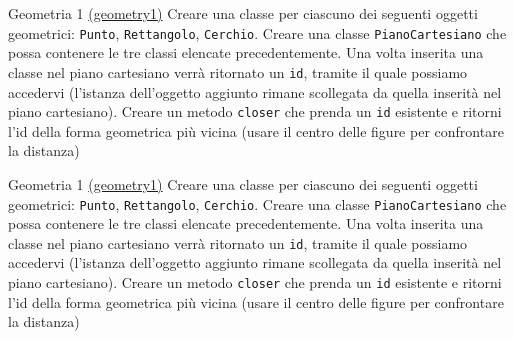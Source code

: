 \begin{esercizio}{Geometria 1 \href{run:./files/java/esercizi/geometry1/}{(geometry1)}}
	Creare una classe per ciascuno dei seguenti oggetti geometrici: \texttt{Punto}, \texttt{Rettangolo}, \texttt{Cerchio}. Creare una classe \texttt{PianoCartesiano} che possa contenere le tre classi elencate precedentemente. Una volta inserita una classe nel piano cartesiano verrà ritornato un \verb|id|, tramite il quale possiamo accedervi (l'istanza dell'oggetto aggiunto rimane scollegata da quella inserità nel piano cartesiano). Creare un metodo \verb|closer| che prenda un \verb|id| esistente e ritorni l'id della forma geometrica più vicina (usare il centro delle figure per confrontare la distanza)
\end{esercizio}

\begin{esercizio}{Geometria 1 \href{run:./files/java/esercizi/geometry1/}{(geometry1)}}
	Creare una classe per ciascuno dei seguenti oggetti geometrici: \texttt{Punto}, \texttt{Rettangolo}, \texttt{Cerchio}. Creare una classe \texttt{PianoCartesiano} che possa contenere le tre classi elencate precedentemente. Una volta inserita una classe nel piano cartesiano verrà ritornato un \verb|id|, tramite il quale possiamo accedervi (l'istanza dell'oggetto aggiunto rimane scollegata da quella inserità nel piano cartesiano). Creare un metodo \verb|closer| che prenda un \verb|id| esistente e ritorni l'id della forma geometrica più vicina (usare il centro delle figure per confrontare la distanza)
\end{esercizio}



